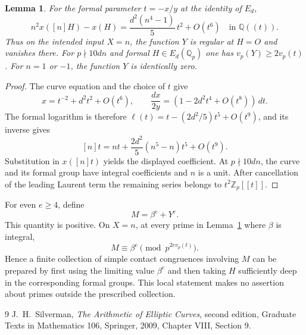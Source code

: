 \documentclass[11pt,a4paper]{article}
\newtheorem{lemma}[theorem]{Lemma}
\newcommand{\Q}{\mathbb Q}\newcommand{\Z}{\mathbb Z}
\begin{document}
\begin{lemma}\label{lem:local}
For the formal parameter $t=-x/y$ at the identity of $E_d$,
\[
 n^2x([n]H)-x(H)
       =\frac{d^2(n^4-1)}5\,t^2+O(t^6)\quad\text{in }\Q((t)).
\]
Thus on the intended input $X=n$, the function $Y$ is regular
at $H=O$ and vanishes there. For $p\nmid 10dn$ and formal
$H\in E_d(\Q_p)$ one has $v_p(Y)\ge2v_p(t)$.
For $n=1$ or $-1$, the function $Y$ is identically zero.
\end{lemma}
\begin{proof}
The curve equation and the choice of $t$ give
\[
 x=t^{-2}+d^2t^2+O(t^6),\qquad
 \frac{dx}{2y}=(1-2d^2t^4+O(t^8))\,dt.
\]
The formal logarithm is therefore
$\ell(t)=t-(2d^2/5)t^5+O(t^9)$, and its inverse gives
\[
 [n]t=nt+\frac{2d^2}{5}(n^5-n)t^5+O(t^9).
\]
Substitution in $x([n]t)$ yields the displayed coefficient.
At $p\nmid10dn$, the curve and its formal group have integral
coefficients and $n$ is a unit. After cancellation of the leading
Laurent term the remaining series belongs to $t^2\Z_p[[t]]$.
\end{proof}

For even $e\ge4$, define
\[
 M=\beta^e+Y^e.
\]
This quantity is positive. On $X=n$, at every prime in
Lemma~\ref{lem:local} where $\beta$ is integral,
\[
 M\equiv\beta^e\pmod{p^{2e v_p(t)}}.
\]
Hence a finite collection of simple contact congruences involving
$M$ can be prepared by first using the limiting value $\beta^e$
and then taking $H$ sufficiently deep in the corresponding formal
groups. This local statement makes no assertion about primes
outside the prescribed collection.

\begin{thebibliography}{9}
J.~H.~Silverman, \emph{The Arithmetic of Elliptic Curves},
second edition, Graduate Texts in Mathematics 106, Springer, 2009,
Chapter VIII, Section 9.
\end{thebibliography}
\end{document}
